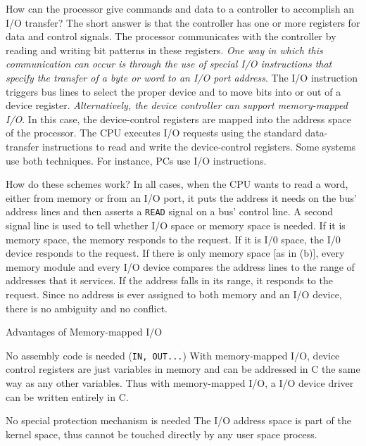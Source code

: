How can the processor give commands and data to a controller to accomplish an I/O
transfer? The short answer is that the controller has one or more registers for data and
control signals. The processor communicates with the controller by reading and writing bit
patterns in these registers. \emph{One way in which this communication can occur is through
  the use of special I/O instructions that specify the transfer of a byte or word to an
  I/O port address}. The I/O instruction triggers bus lines to select the proper device
and to move bits into or out of a device register. \emph{Alternatively, the device
  controller can support memory-mapped I/O}. In this case, the device-control registers
are mapped into the address space of the processor. The CPU executes I/O requests using
the standard data-transfer instructions to read and write the device-control registers.
Some systems use both techniques. For instance, PCs use I/O instructions.

How do these schemes work? In all cases, when the CPU wants to read a word, either from
memory or from an I/O port, it puts the address it needs on the bus' address lines and
then asserts a \texttt{READ} signal on a bus' control line. A second signal line is used to
tell whether I/O space or memory space is needed. If it is memory space, the memory
responds to the request. If it is I/0 space, the I/0 device responds to the request. If
there is only memory space [as in (b)], every memory module and every I/O device compares
the address lines to the range of addresses that it services. If the address falls in its
range, it responds to the request. Since no address is ever assigned to both memory and an
I/O device, there is no ambiguity and no conflict.

\begin{frame}{Advantages of Memory-mapped I/O}
  \begin{block}{No assembly code is needed (\texttt{IN, OUT...})}
    With memory-mapped I/O, device control registers are just variables in memory and can
    be addressed in C the same way as any other variables. Thus with memory-mapped I/O, a
    I/O device driver can be written entirely in C.
  \end{block}
  \begin{block}{No special protection mechanism is needed}
    The I/O address space is part of the kernel space, thus cannot be touched directly by
    any user space process.
  \end{block}
\end{frame}

